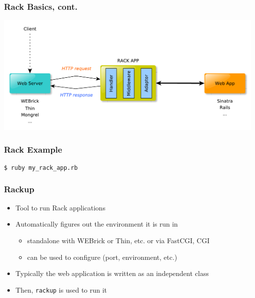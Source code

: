 \documentclass{beamer}
\begin{document}
\begin{frame}[fragile]\frametitle{Rack Basics, cont.}

  \begin{center}
    \includegraphics[scale=0.5]{diagrams/rack.pdf}  
  \end{center}

\end{frame}



\begin{frame}[fragile]\frametitle{Rack Example}
  

  \begin{lstlisting}[language=bash, escapechar={^}]
$ ruby my_rack_app.rb
  \end{lstlisting}
\end{frame}



\begin{frame}\frametitle{Rackup}
  
  \begin{itemize}
  
    \item Tool to run Rack applications
    \item Automatically figures out the environment it is run in
    \begin{itemize}
      \item standalone with WEBrick or Thin, etc. or via FastCGI, CGI
      \item can be used to configure (port, environment, etc.)
    \end{itemize}
    
    \item Typically the web application is written as an independent class
    \item Then, \texttt{rackup} is used to run it    
        
  \end{itemize}

\end{frame}
\end{document}
